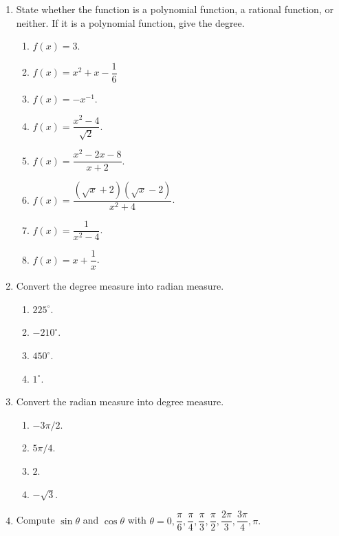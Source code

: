 \documentclass[11pt]{book}
\begin{document}
\begin{enumerate}[label=\arabic*.]
    \item State whether the function is a polynomial function, a rational function, or neither. If it is a polynomial function, give the degree.
    \begin{multicols}{2}
        \begin{enumerate}
            \item $f(x)=3$.
            \item $f(x)=x^2+x-\dfrac{1}{6}$
            \item $f(x)=-x^{-1}$.
            \item $f(x)=\dfrac{x^2-4}{\sqrt{2}}$.
            \item $f(x)=\dfrac{x^2-2x-8}{x+2}$.
            \item $f(x)=\dfrac{(\sqrt{x}+2)(\sqrt{x}-2)}{x^2+4}$.
            \item $f(x)=\dfrac{1}{x^2-4}$.
            \item $f(x)=x+\dfrac{1}{x}$.
        \end{enumerate}
    \end{multicols}
    \item Convert the degree measure into radian measure.
    \begin{multicols}{4}
        \begin{enumerate}
            \item $225^\circ$.
            \item $-210^\circ$.
            \item $450^\circ$.
            \item $1^\circ$.
        \end{enumerate}
    \end{multicols}
    \item Convert the radian measure into degree measure.
    \begin{multicols}{4}
        \begin{enumerate}
            \item $-3\pi/2$.
            \item $5\pi/4$.
            \item $2$.
            \item $-\sqrt{3}$.
        \end{enumerate}
    \end{multicols}
    \item Compute $\sin\theta$ and $\cos\theta$ with $\theta=0, \dfrac{\pi}{6}, \dfrac{\pi}{4}, \dfrac{\pi}{3}, \dfrac{\pi}{2}, \dfrac{2\pi}{3}, \dfrac{3\pi}{4}, \pi.$

\end{enumerate}
\end{document}
